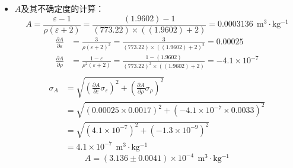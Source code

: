 \documentclass[cn,hazy,pku,12pt,normal,math=newtx,cite=super]{elegantnote}
\begin{document}
\begin{itemize}
    \item $A$及其不确定度的计算：
    \begin{equation*}
A=\frac{\varepsilon - 1}{\rho \left(\varepsilon + 2\right)}=\frac{\left(1.9602\right) - 1}{\left(773.22\right) \times \left(\left(1.9602\right) + 2\right)}=0.0003136\ \mathrm{~m^3\cdot kg^{-1}}
\end{equation*}
\begin{equation*}
\begin{aligned}
\frac{\partial A }{\partial \varepsilon }&=\frac{3}{\rho \left(\varepsilon + 2\right)^{2}}=\frac{3}{\left(773.22\right) \times \left(\left(1.9602\right) + 2\right)^{2}}=0.00025\\        
\frac{\partial A }{\partial \rho }&=\frac{1 - \varepsilon}{\rho^{2} \left(\varepsilon + 2\right)}=\frac{1 - \left(1.9602\right)}{\left(773.22\right)^{2} \times \left(\left(1.9602\right) + 2\right)}=-4.1 \times 10^{-7}\\
\end{aligned}
\end{equation*}
\begin{equation*}
\begin{aligned}
\sigma_{A}&=\sqrt{\left(\frac{\partial A }{\partial \varepsilon } \sigma_{\varepsilon}\right)^2+\left(\frac{\partial A }{\partial \rho } \sigma_{\rho}\right)^2}\\
&=\sqrt{\left(0.00025 \times 0.0017\right)^2+\left(-4.1 \times 10^{-7} \times 0.0033\right)^2}\\
&=\sqrt{\left(4.1 \times 10^{-7}\right)^2+\left(-1.3 \times 10^{-9}\right)^2}\\
&=4.1 \times 10^{-7}\ \mathrm{~m^3\cdot kg^{-1}}
\end{aligned}
\end{equation*}
\begin{equation*}
A= (3.136 \pm 0.0041) \times 10^{-4} \ \mathrm{~m^3\cdot kg^{-1}}
\end{equation*}


\end{itemize}
\end{document}

